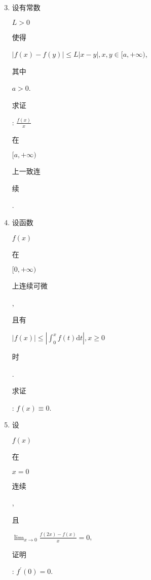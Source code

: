 \documentclass[10pt]{article}
\begin{document}
\begin{enumerate}
  \setcounter{enumi}{2}
  \item \begin{CJK}{UTF8}{mj}设有常数\end{CJK} $L>0$ \begin{CJK}{UTF8}{mj}使得\end{CJK} $|f(x)-f(y)| \leqslant L|x-y|, x, y \in[a,+\infty)$, \begin{CJK}{UTF8}{mj}其中\end{CJK} $a>0$. \begin{CJK}{UTF8}{mj}求证\end{CJK}: $\frac{f(x)}{x}$ \begin{CJK}{UTF8}{mj}在\end{CJK} $[a,+\infty)$ \begin{CJK}{UTF8}{mj}上一致连\end{CJK} \begin{CJK}{UTF8}{mj}续\end{CJK}.

  \item \begin{CJK}{UTF8}{mj}设函数\end{CJK} $f(x)$ \begin{CJK}{UTF8}{mj}在\end{CJK} $[0,+\infty)$ \begin{CJK}{UTF8}{mj}上连续可微\end{CJK}, \begin{CJK}{UTF8}{mj}且有\end{CJK} $|f(x)| \leqslant\left|\int_{0}^{x} f(t) \mathrm{d} t\right|, x \geqslant 0$ \begin{CJK}{UTF8}{mj}时\end{CJK}. \begin{CJK}{UTF8}{mj}求证\end{CJK}: $f(x) \equiv 0$.

  \item \begin{CJK}{UTF8}{mj}设\end{CJK} $f(x)$ \begin{CJK}{UTF8}{mj}在\end{CJK} $x=0$ \begin{CJK}{UTF8}{mj}连续\end{CJK}, \begin{CJK}{UTF8}{mj}且\end{CJK} $\lim _{x \rightarrow 0} \frac{f(2 x)-f(x)}{x}=0$, \begin{CJK}{UTF8}{mj}证明\end{CJK}: $f^{\prime}(0)=0$.


\end{enumerate}
\end{document}
